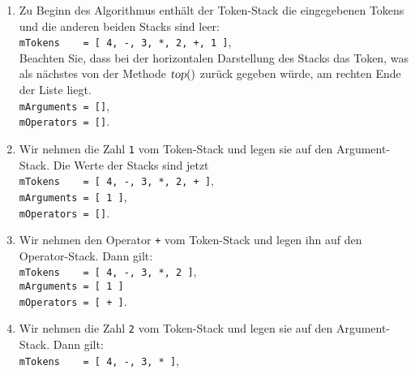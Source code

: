 \begin{enumerate}
\item Zu Beginn des Algorithmus enth\"alt der Token-Stack die eingegebenen Tokens und die
      anderen beiden Stacks sind leer: \\[0.1cm]
      \hspace*{1.3cm} 
      \texttt{mTokens \ \ \ = [ 4, -, 3,
        *, 2, +, 1 ]}, 
      \\[0.1cm]
      Beachten Sie, dass bei der horizontalen Darstellung des Stacks das Token, was als
      n\"achstes von der Methode $\textsl{top}()$ zur\"uck gegeben w\"urde, am rechten Ende der
      Liste liegt.  \\[0.1cm]
      \hspace*{1.3cm} \texttt{mArguments = []}, \\[0.1cm]
      \hspace*{1.3cm} \texttt{mOperators = []}. 
\item Wir nehmen die Zahl \texttt{1} vom Token-Stack und legen sie auf den Argument-Stack.  
      Die Werte der Stacks sind jetzt \\[0.1cm]
      \hspace*{1.3cm} \texttt{mTokens \ \ \ = [ 4, -, 3, *, 2, + ]}, \\[0.1cm]
      \hspace*{1.3cm} \texttt{mArguments = [ 1 ]}, \\[0.1cm]
      \hspace*{1.3cm} \texttt{mOperators = []}. 
\item Wir nehmen den Operator \texttt{+} vom Token-Stack und legen ihn auf den Operator-Stack.
      Dann gilt: \\[0.1cm]
      \hspace*{1.3cm} \texttt{mTokens \ \ \ = [ 4, -, 3, *, 2 ]}, \\[0.1cm]
      \hspace*{1.3cm} \texttt{mArguments = [ 1 ]} \\[0.1cm]
      \hspace*{1.3cm} \texttt{mOperators = [ + ]}. 
\item Wir nehmen die Zahl \texttt{2} vom Token-Stack und legen sie auf den Argument-Stack.
      Dann gilt: \\[0.1cm]
      \hspace*{1.3cm} \texttt{mTokens \ \ \ = [ 4, -, 3, * ]}, \\[0.1cm]

\end{enumerate}
